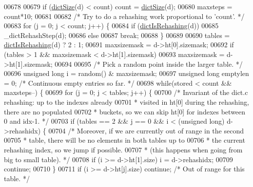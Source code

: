 \begin{DoxyCode}
00678 
00679     \textcolor{keywordflow}{if} (\hyperlink{dict_8h_af193430dd3d5579a52b194512f72c1f0}{dictSize}(d) < count) count = \hyperlink{dict_8h_af193430dd3d5579a52b194512f72c1f0}{dictSize}(d);
00680     maxsteps = count*10;
00681 
00682     \textcolor{comment}{/* Try to do a rehashing work proportional to 'count'. */}
00683     \textcolor{keywordflow}{for} (j = 0; j < count; j++) \{
00684         \textcolor{keywordflow}{if} (\hyperlink{dict_8h_aa6e4917a6a32fdf47180e03ed8969e02}{dictIsRehashing}(d))
00685             \_dictRehashStep(d);
00686         \textcolor{keywordflow}{else}
00687             \textcolor{keywordflow}{break};
00688     \}
00689 
00690     tables = \hyperlink{dict_8h_aa6e4917a6a32fdf47180e03ed8969e02}{dictIsRehashing}(d) ? 2 : 1;
00691     maxsizemask = d->ht[0].sizemask;
00692     \textcolor{keywordflow}{if} (tables > 1 && maxsizemask < d->ht[1].sizemask)
00693         maxsizemask = d->ht[1].sizemask;
00694 
00695     \textcolor{comment}{/* Pick a random point inside the larger table. */}
00696     \textcolor{keywordtype}{unsigned} \textcolor{keywordtype}{long} i = random() & maxsizemask;
00697     \textcolor{keywordtype}{unsigned} \textcolor{keywordtype}{long} emptylen = 0; \textcolor{comment}{/* Continuous empty entries so far. */}
00698     \textcolor{keywordflow}{while}(stored < count && maxsteps--) \{
00699         \textcolor{keywordflow}{for} (j = 0; j < tables; j++) \{
00700             \textcolor{comment}{/* Invariant of the dict.c rehashing: up to the indexes already}
00701 \textcolor{comment}{             * visited in ht[0] during the rehashing, there are no populated}
00702 \textcolor{comment}{             * buckets, so we can skip ht[0] for indexes between 0 and idx-1. */}
00703             \textcolor{keywordflow}{if} (tables == 2 && j == 0 && i < (\textcolor{keywordtype}{unsigned} \textcolor{keywordtype}{long}) d->rehashidx) \{
00704                 \textcolor{comment}{/* Moreover, if we are currently out of range in the second}
00705 \textcolor{comment}{                 * table, there will be no elements in both tables up to}
00706 \textcolor{comment}{                 * the current rehashing index, so we jump if possible.}
00707 \textcolor{comment}{                 * (this happens when going from big to small table). */}
00708                 \textcolor{keywordflow}{if} (i >= d->ht[1].size) i = d->rehashidx;
00709                 \textcolor{keywordflow}{continue};
00710             \}
00711             \textcolor{keywordflow}{if} (i >= d->ht[j].size) \textcolor{keywordflow}{continue}; \textcolor{comment}{/* Out of range for this table. */}

\end{DoxyCode}
